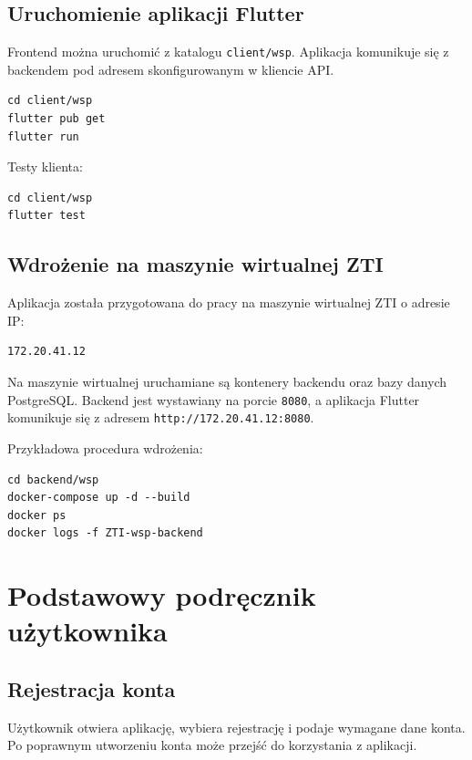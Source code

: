 \documentclass[12pt,a4paper]{article}
\begin{document}
\subsection{Uruchomienie aplikacji Flutter}

Frontend można uruchomić z katalogu \texttt{client/wsp}. Aplikacja komunikuje się z backendem pod adresem skonfigurowanym w kliencie API.

\begin{lstlisting}[style=terminal]
cd client/wsp
flutter pub get
flutter run
\end{lstlisting}

Testy klienta:

\begin{lstlisting}[style=terminal]
cd client/wsp
flutter test
\end{lstlisting}

\subsection{Wdrożenie na maszynie wirtualnej ZTI}

Aplikacja została przygotowana do pracy na maszynie wirtualnej ZTI o adresie IP:

\begin{lstlisting}[style=terminal]
172.20.41.12
\end{lstlisting}

Na maszynie wirtualnej uruchamiane są kontenery backendu oraz bazy danych PostgreSQL. Backend jest wystawiany na porcie \texttt{8080}, a aplikacja Flutter komunikuje się z adresem \texttt{http://172.20.41.12:8080}.

Przykładowa procedura wdrożenia:

\begin{lstlisting}[style=terminal]
cd backend/wsp
docker-compose up -d --build
docker ps
docker logs -f ZTI-wsp-backend
\end{lstlisting}

\section{Podstawowy podręcznik użytkownika}

\subsection{Rejestracja konta}

Użytkownik otwiera aplikację, wybiera rejestrację i podaje wymagane dane konta. Po poprawnym utworzeniu konta może przejść do korzystania z aplikacji.
\end{document}
